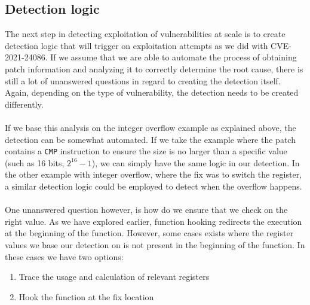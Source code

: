 \documentclass{report}
\begin{document}
\subsection{Detection logic}
The next step in detecting exploitation of vulnerabilities at scale is to create detection logic that will trigger on exploitation attempts as we did with CVE-2021-24086. If we assume that we are able to automate the process of obtaining patch information and analyzing it to correctly determine the root cause, there is still a lot of unanswered questions in regard to creating the detection itself. Again, depending on the type of vulnerability, the detection needs to be created differently.
\\
\\
If we base this analysis on the integer overflow example as explained above, the detection can be somewhat automated. If we take the example where the patch contains a \texttt{CMP} instruction to ensure the size is no larger than a specific value (such as 16 bits, $2^{16}-1$), we can simply have the same logic in our detection. In the other example with integer overflow, where the fix was to switch the register, a similar detection logic could be employed to detect when the overflow happens.
\\
\\
One unanswered question however, is how do we ensure that we check on the right value. As we have explored earlier, function hooking redirects the execution at the beginning of the function. However, some cases exists where the register values we base our detection on is not present in the beginning of the function. In these cases we have two options:

\begin{enumerate}
    \item Trace the usage and calculation of relevant registers
    \item Hook the function at the fix location
\end{enumerate}
\end{document}
